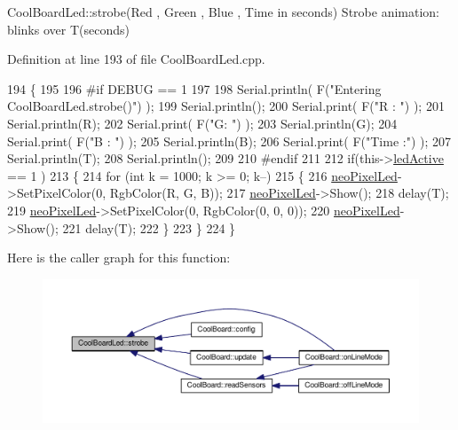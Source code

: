 Cool\+Board\+Led\+::strobe(\+Red , Green , Blue , Time in seconds) Strobe animation\+: blinks over T(seconds) 

Definition at line 193 of file Cool\+Board\+Led.\+cpp.


\begin{DoxyCode}
194 \{
195 
196 \textcolor{preprocessor}{#if DEBUG == 1}
197 
198     Serial.println( F(\textcolor{stringliteral}{"Entering CoolBoardLed.strobe()"}) );
199     Serial.println();
200     Serial.print( F(\textcolor{stringliteral}{"R : "}) );
201     Serial.println(R);
202     Serial.print( F(\textcolor{stringliteral}{"G: "}) );
203     Serial.println(G);
204     Serial.print( F(\textcolor{stringliteral}{"B : "}) );
205     Serial.println(B);
206     Serial.print( F(\textcolor{stringliteral}{"Time :"}) );
207     Serial.println(T);
208     Serial.println();
209 
210 \textcolor{preprocessor}{#endif  }
211 
212     \textcolor{keywordflow}{if}(this->\hyperlink{class_cool_board_led_aadd04d2ecf123247718d77f42fba7f08}{ledActive} == 1 )
213     \{   
214         \textcolor{keywordflow}{for} (\textcolor{keywordtype}{int} k = 1000; k >= 0; k--) 
215         \{
216             \hyperlink{class_cool_board_led_ac2c13fa462a010cd9242bf297c013923}{neoPixelLed}->SetPixelColor(0, RgbColor(R, G, B));
217             \hyperlink{class_cool_board_led_ac2c13fa462a010cd9242bf297c013923}{neoPixelLed}->Show();
218             delay(T);
219             \hyperlink{class_cool_board_led_ac2c13fa462a010cd9242bf297c013923}{neoPixelLed}->SetPixelColor(0, RgbColor(0, 0, 0));
220             \hyperlink{class_cool_board_led_ac2c13fa462a010cd9242bf297c013923}{neoPixelLed}->Show();
221             delay(T);
222         \}
223     \}
224 \}
\end{DoxyCode}
Here is the caller graph for this function\+:\nopagebreak
\begin{figure}[H]
\begin{center}
\leavevmode
\includegraphics[width=350pt]{de/dc0/class_cool_board_led_ad5f0de4c628cbfbf49896042831c64ad_icgraph}
\end{center}
\end{figure}
\mbox{\label{class_cool_board_led_a30fadd4cbec17ceea428bf7a32207e87}} 
